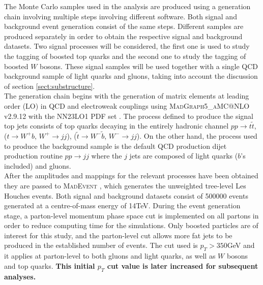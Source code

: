\documentclass[main]{subfiles} %
\begin{document}


\doublespacing


\vspace{20pt}

The Monte Carlo samples used in the analysis are produced using a generation chain involving multiple steps involving different software. Both signal and background event generation consist of the same steps. Different samples are produced separately in order to obtain the respective signal and background datasets. Two signal processes will be considered, the first one is used to study the tagging of boosted top quarks and the second one to study the tagging of boosted $W$ bosons. These signal samples will be used together with a single QCD background sample of light quarks and gluons, taking into account the discussion of section \ref{sect:substructure}.\\


The generation chain begins with the generation of matrix elements at leading order (LO) in QCD and electroweak couplings using \textsc{MadGraph5\_aMC@NLO} v2.9.12 \cite{Alwall2014} with the \textsc{NN23LO1} PDF set \cite{Ball2017}. The process defined to produce the signal top jets consists of top quarks decaying in the entirely hadronic channel $pp \rightarrow t \tilde{t}$, ($t \rightarrow W^+ b$, $W^+ \rightarrow jj$), ($\tilde{t} \rightarrow W^- \tilde{b}$, $W^- \rightarrow jj$). On the other hand, the process used to produce the background sample is the default QCD production dijet production routine $pp \rightarrow jj$ where the $j$ jets are composed of light quarks ($b$'s included) and gluons.\\

After the amplitudes and mappings for the relevant processes have been obtained they are passed to \textsc{MadEvent} \cite{Maltoni2003}, which generates the unweighted tree-level Les Houches events. Both signal and background datasets consist of 500000 events generated at a centre-of-mass energy of 14\;TeV. During the event generation stage, a parton-level momentum phase space cut is implemented on all partons in order to reduce computing time for the simulations. Only boosted particles are of interest for this study, and the parton-level cut allows more fat jets to be produced in the established number of events. The cut used is $p_T > 350$\;GeV and it applies at parton-level to both gluons and light quarks, as well as $W$ bosons and top quarks. \textbf{This initial $p_T$ cut value is later increased for subsequent analyses.}\\
\end{document}
